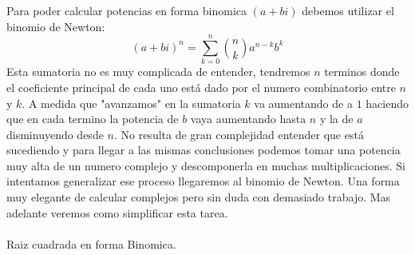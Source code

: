 \documentclass[]{article}
\begin{document}
Para poder calcular potencias en forma binomica $(a+bi)$ debemos utilizar el binomio de Newton:
$$
(a+bi)^{n} = \sum_{k=0}^{n}\binom{n}{k}a^{n-k}b^{k} 
$$
Esta sumatoria no es muy complicada de entender, tendremos $n$ terminos donde el coeficiente principal de cada uno está dado por el numero combinatorio entre $n$ y $k$. A medida que "avanzamos" en la sumatoria $k$ va aumentando de a $1$ haciendo que en cada termino la potencia de $b$ vaya aumentando hasta $n$ y la de $a$ disminuyendo desde $n$. No resulta de gran complejidad entender que está sucediendo y para llegar a las mismas conclusiones podemos tomar una potencia muy alta de un numero complejo y descomponerla en muchas multiplicaciones. Si intentamos generalizar ese proceso llegaremos al binomio de Newton. Una forma muy elegante de calcular complejos pero sin duda con demasiado trabajo. Mas adelante veremos como simplificar esta tarea.
\\
\\
\Large Raiz cuadrada en forma Binomica.
\normalsize
\\
\\
\end{document}
